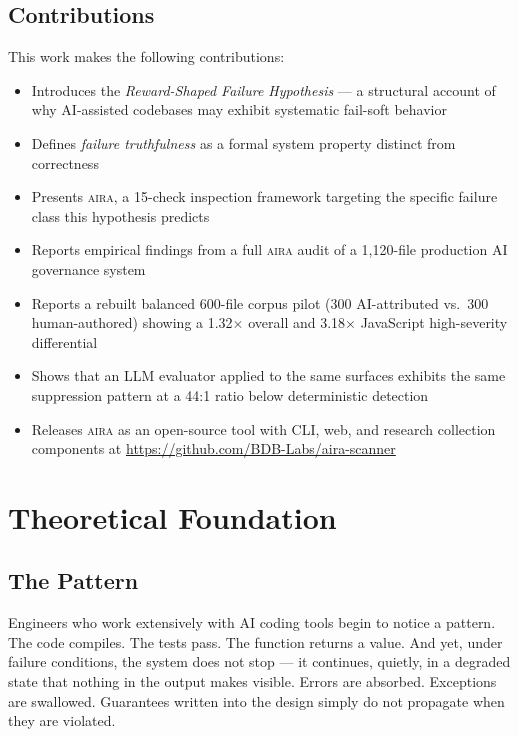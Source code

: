 \documentclass[11pt]{article}
\newcommand{\aira}{\textsc{aira}}
\begin{document}
\subsection{Contributions}

This work makes the following contributions:
\begin{itemize}
  \item Introduces the \emph{Reward-Shaped Failure Hypothesis} --- a structural account of
        why AI-assisted codebases may exhibit systematic fail-soft behavior
  \item Defines \emph{failure truthfulness} as a formal system property distinct from
        correctness
  \item Presents \aira{}, a 15-check inspection framework targeting the specific failure
        class this hypothesis predicts
  \item Reports empirical findings from a full \aira{} audit of a 1,120-file production
        AI governance system
  \item Reports a rebuilt balanced 600-file corpus pilot (300 AI-attributed vs.\ 300
        human-authored) showing a 1.32$\times$ overall and 3.18$\times$ JavaScript
        high-severity differential
  \item Shows that an LLM evaluator applied to the same surfaces exhibits the same
        suppression pattern at a 44:1 ratio below deterministic detection
  \item Releases \aira{} as an open-source tool with CLI, web, and research collection
        components at \url{https://github.com/BDB-Labs/aira-scanner}
\end{itemize}

\section{Theoretical Foundation}
\label{sec:theory}

\subsection{The Pattern}

Engineers who work extensively with AI coding tools begin to notice a pattern. The code
compiles. The tests pass. The function returns a value. And yet, under failure conditions,
the system does not stop --- it continues, quietly, in a degraded state that nothing in the
output makes visible. Errors are absorbed. Exceptions are swallowed. Guarantees written into
the design simply do not propagate when they are violated.
\end{document}
